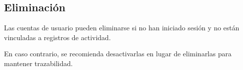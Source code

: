 \documentclass[a4paper]{article}
\begin{document}
\hypertarget{toc185}{}
\subsection{Eliminación}

Las cuentas de usuario pueden eliminarse si no han iniciado sesión y no están vinculadas a registros de actividad.

En caso contrario, se recomienda desactivarlas en lugar de eliminarlas para mantener trazabilidad.

\end{document}
